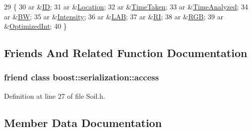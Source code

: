 \begin{DoxyCode}
29                                                           \{
30     ar &\hyperlink{class_soil_analyzer_1_1_soil_a0011c3cd2a504e34c5962cbf72e397da}{ID};
31     ar &\hyperlink{class_soil_analyzer_1_1_soil_a9c3cabd71691bfc4bb56d32fdb298e72}{Location};
32     ar &\hyperlink{class_soil_analyzer_1_1_soil_ae459914e6c463e97d1761d791f653b2d}{TimeTaken};
33     ar &\hyperlink{class_soil_analyzer_1_1_soil_a3c1c025be53aae3cbe858b7a7936d8dd}{TimeAnalyzed};
34     ar &\hyperlink{class_soil_analyzer_1_1_soil_ae11b578192ebae3165f75c09d6116f74}{BW};
35     ar &\hyperlink{class_soil_analyzer_1_1_soil_a6f56200f2722df5b849d8cddd094c852}{Intensity};
36     ar &\hyperlink{class_soil_analyzer_1_1_soil_a59ee773ff73380a12b1c2af3b86f6638}{LAB};
37     ar &\hyperlink{class_soil_analyzer_1_1_soil_abe8693b60a3d88433ffb8255b8d260c3}{RI};
38     ar &\hyperlink{class_soil_analyzer_1_1_soil_a4a328e0ebe7f1f3c5a1c4c581180d19e}{RGB};
39     ar &\hyperlink{class_soil_analyzer_1_1_soil_a27f7c15f63cbf64c07ceedb30c25e861}{OptimizedInt};
40   \}
\end{DoxyCode}


\subsection{Friends And Related Function Documentation}
\hypertarget{class_soil_analyzer_1_1_soil_ac98d07dd8f7b70e16ccb9a01abf56b9c}{}
\subsubsection[{boost\+::serialization\+::access}]{\setlength{\rightskip}{0pt plus 5cm}friend class boost\+::serialization\+::access\hspace{0.3cm}{\ttfamily [friend]}}\label{class_soil_analyzer_1_1_soil_ac98d07dd8f7b70e16ccb9a01abf56b9c}


Definition at line 27 of file Soil.\+h.



\subsection{Member Data Documentation}
\hypertarget{class_soil_analyzer_1_1_soil_ae11b578192ebae3165f75c09d6116f74}{}
